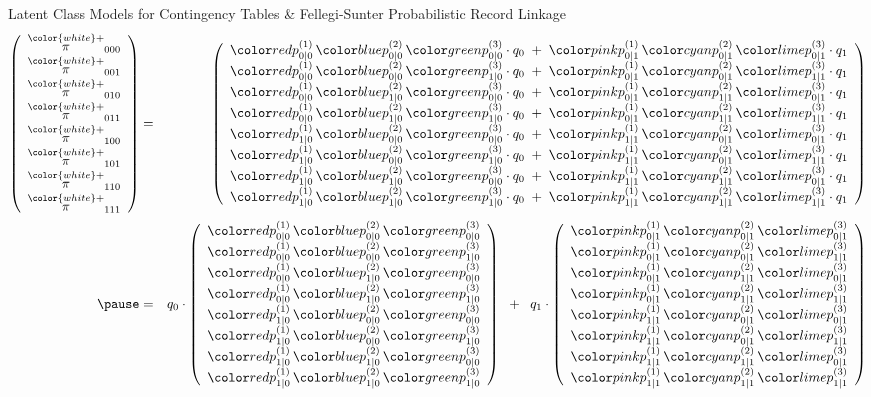 \begin{frame}{\Large \vskip -0.3cm Latent Class Models for Contingency Tables \&\vskip 0.1cm Fellegi-Sunter Probabilistic Record Linkage}
\begin{eqnarray*}
\left(\begin{array}{c}
\overset{{\color{white}+}}{\pi}_{000} \\
\overset{{\color{white}+}}{\pi}_{001} \\
\overset{{\color{white}+}}{\pi}_{010} \\
\overset{{\color{white}+}}{\pi}_{011} \\
\overset{{\color{white}+}}{\pi}_{100} \\
\overset{{\color{white}+}}{\pi}_{101} \\
\overset{{\color{white}+}}{\pi}_{110} \\
\overset{{\color{white}+}}{\pi}_{111} \\
\end{array}\right)
& = &
\left(\begin{array}{c}
\pozz\,\ptzz\,\phzz \cdot q_{0} \;+\; \pozo\,\ptzo\,\phzo \cdot q_{1} \\
\pozz\,\ptzz\,\phoz \cdot q_{0} \;+\; \pozo\,\ptzo\,\phoo \cdot q_{1} \\
\pozz\,\ptoz\,\phzz \cdot q_{0} \;+\; \pozo\,\ptoo\,\phzo \cdot q_{1} \\
\pozz\,\ptoz\,\phoz \cdot q_{0} \;+\; \pozo\,\ptoo\,\phoo \cdot q_{1} \\
\pooz\,\ptzz\,\phzz \cdot q_{0} \;+\; \pooo\,\ptzo\,\phzo \cdot q_{1} \\
\pooz\,\ptzz\,\phoz \cdot q_{0} \;+\; \pooo\,\ptzo\,\phoo \cdot q_{1} \\
\pooz\,\ptoz\,\phzz \cdot q_{0} \;+\; \pooo\,\ptoo\,\phzo \cdot q_{1} \\
\pooz\,\ptoz\,\phoz \cdot q_{0} \;+\; \pooo\,\ptoo\,\phoo \cdot q_{1} \\
\end{array}\right)
\\
\pause
& = &
q_{0} \cdot
\left(\begin{array}{c}
\pozz\,\ptzz\,\phzz \\
\pozz\,\ptzz\,\phoz \\
\pozz\,\ptoz\,\phzz \\ 
\pozz\,\ptoz\,\phoz \\
\pooz\,\ptzz\,\phzz \\
\pooz\,\ptzz\,\phoz \\
\pooz\,\ptoz\,\phzz \\
\pooz\,\ptoz\,\phoz
\end{array}\right)
\;\; + \;\;
q_{1} \cdot
\left(\begin{array}{c}
\pozo\,\ptzo\,\phzo \\
\pozo\,\ptzo\,\phoo \\
\pozo\,\ptoo\,\phzo \\
\pozo\,\ptoo\,\phoo \\
\pooo\,\ptzo\,\phzo \\
\pooo\,\ptzo\,\phoo \\
\pooo\,\ptoo\,\phzo \\
\pooo\,\ptoo\,\phoo
\end{array}\right)
\end{eqnarray*}


\end{frame}
